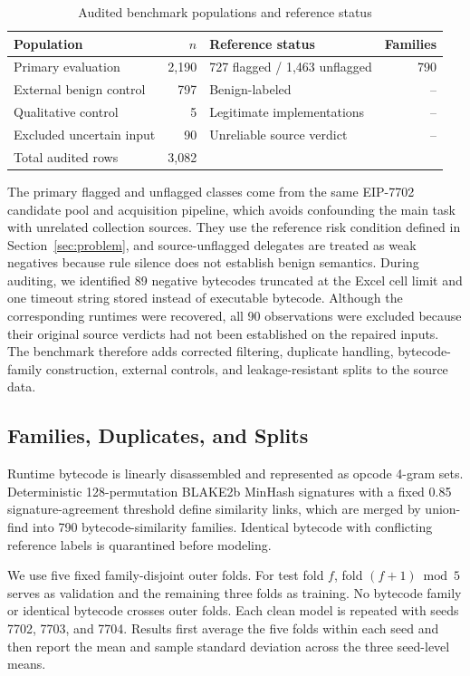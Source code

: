 \documentclass[conference]{IEEEtran}
\begin{document}
\begin{table}[t]
\centering
\caption{Audited benchmark populations and reference status}
\label{tab:dataset}
\scriptsize
\begin{tabularx}{\columnwidth}{@{}X r X r@{}}
\toprule
Population & $n$ & Reference status & Families \\
\midrule
Primary evaluation & 2,190 & 727 flagged / 1,463 unflagged & 790 \\
External benign control & 797 & Benign-labeled & -- \\
Qualitative control & 5 & Legitimate implementations & -- \\
Excluded uncertain input & 90 & Unreliable source verdict & -- \\
\midrule
Total audited rows & 3,082 & & \\
\bottomrule
\end{tabularx}
\end{table}

The primary flagged and unflagged classes come from the same EIP-7702 candidate pool and acquisition pipeline, which avoids confounding the main task with unrelated collection sources. They use the reference risk condition defined in Section~\ref{sec:problem}, and source-unflagged delegates are treated as weak negatives because rule silence does not establish benign semantics. During auditing, we identified 89 negative bytecodes truncated at the Excel cell limit and one timeout string stored instead of executable bytecode. Although the corresponding runtimes were recovered, all 90 observations were excluded because their original source verdicts had not been established on the repaired inputs. The benchmark therefore adds corrected filtering, duplicate handling, bytecode-family construction, external controls, and leakage-resistant splits to the source data.

\subsection{Families, Duplicates, and Splits}

Runtime bytecode is linearly disassembled and represented as opcode 4-gram sets. Deterministic 128-permutation BLAKE2b MinHash signatures with a fixed 0.85 signature-agreement threshold define similarity links, which are merged by union-find into 790 bytecode-similarity families. Identical bytecode with conflicting reference labels is quarantined before modeling.

We use five fixed family-disjoint outer folds. For test fold $f$, fold $(f+1)\bmod5$ serves as validation and the remaining three folds as training. No bytecode family or identical bytecode crosses outer folds. Each clean model is repeated with seeds 7702, 7703, and 7704. Results first average the five folds within each seed and then report the mean and sample standard deviation across the three seed-level means.
\end{document}
